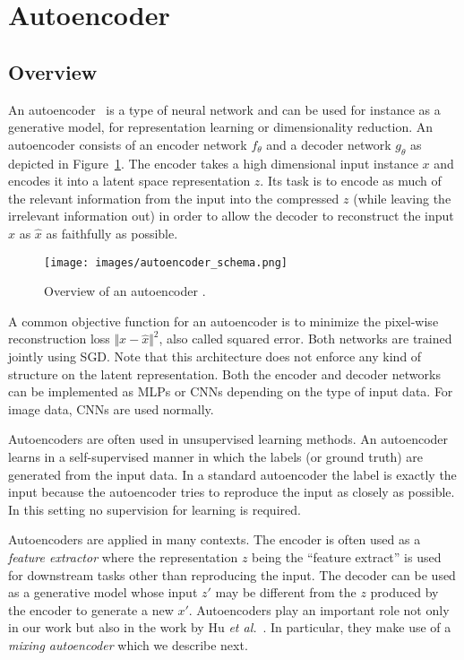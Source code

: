 \documentclass[a4paper,12pt]{report}
\begin{document}
\section{Autoencoder}
\subsection{Overview}
An autoencoder~\cite{Autoencoder,DLReview} is a type of neural network and can be used for instance as a generative model, for representation learning or dimensionality reduction. An autoencoder consists of an encoder network $f_{\theta}$ and a decoder network  $g_{\theta}$ as depicted in Figure~\ref{fig:autoencoder}. The encoder takes a high dimensional input instance $x$ and encodes it into a latent space representation $z$. Its task is to encode as much of the relevant information from the input into the compressed $z$ (while leaving the irrelevant information out) in order to allow the decoder to reconstruct the input $x$ as $\hat{x}$ as faithfully as possible.
\begin{figure}[ht]
\centering
\texttt{[image: images/autoencoder\_schema.png]}
\caption{Overview of an autoencoder \cite{chollet_autoencoders}.}
\label{fig:autoencoder}
\end{figure}
A common objective function for an autoencoder is to minimize the pixel-wise reconstruction loss $\Vert x - \hat{x} \Vert^2$, also called squared error. Both networks are trained jointly using SGD. Note that this architecture does not enforce any kind of structure on the latent representation. Both the encoder and decoder networks can be implemented as MLPs or CNNs depending on the type of input data. For image data, CNNs are used normally.

Autoencoders are often used in unsupervised learning methods. An autoencoder learns in a self-supervised manner in which the labels (or ground truth) are generated from the input data. In a standard autoencoder the label is exactly the input because the autoencoder tries to reproduce the input as closely as possible. In this setting no supervision for learning is required.

Autoencoders are applied in many contexts. The encoder is often used as a \textit{feature extractor} where the representation $z$ being the ``feature extract'' is used for downstream tasks other than reproducing the input. The decoder can be used as a generative model whose input $z'$ may be different from the $z$ produced by the encoder to generate a new $x'$. Autoencoders play an important role not only in our work but also in the work by Hu \textit{et al.}~\cite{DisentFacOfVarByMixTh}. In particular, they make use of a \textit{mixing autoencoder} which we describe next.
\end{document}
